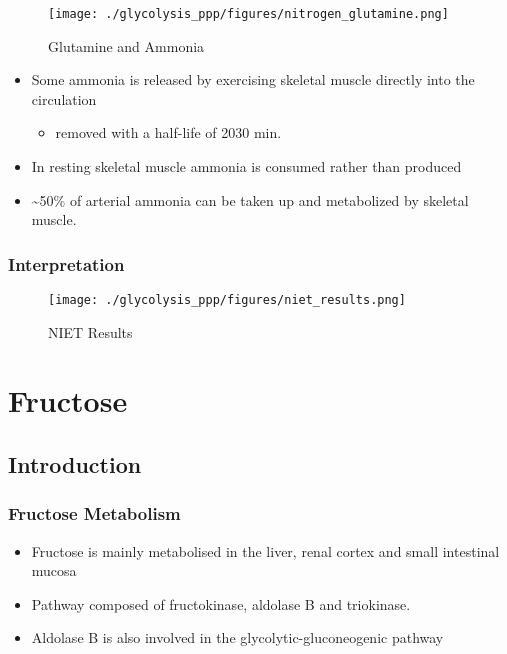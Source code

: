 \documentclass{scrartcl}
\begin{document}
\begin{figure}[htbp]
\centering
\texttt{[image: ./glycolysis\_ppp/figures/nitrogen\_glutamine.png]}
\caption[gln]{\label{fig:org181ad9b}
Glutamine and Ammonia}
\end{figure}

\begin{itemize}
\item Some ammonia is released by exercising skeletal muscle directly into the circulation
\begin{itemize}
\item removed with a half-life of 20\textpm{}30 min.
\end{itemize}
\item In resting skeletal muscle ammonia is consumed rather than produced
\item \textasciitilde{}50\% of arterial ammonia can be taken up and metabolized by skeletal muscle.
\end{itemize}

\subsubsection{Interpretation}
\label{sec:org57ceebb}

\begin{figure}[htbp]
\centering
\texttt{[image: ./glycolysis\_ppp/figures/niet\_results.png]}
\caption[interp]{\label{fig:org0bcb478}
NIET Results}
\end{figure}
\section{Fructose}
\label{sec:org121faac}
\subsection{Introduction}
\label{sec:orgc792b19}
\subsubsection{Fructose Metabolism}
\label{sec:org2a951ee}
\begin{itemize}
\item Fructose is mainly metabolised in the liver, renal cortex and small intestinal mucosa
\item Pathway composed of fructokinase, aldolase B and triokinase.
\item Aldolase B is also involved in the glycolytic-gluconeogenic pathway
\end{itemize}
\end{document}
